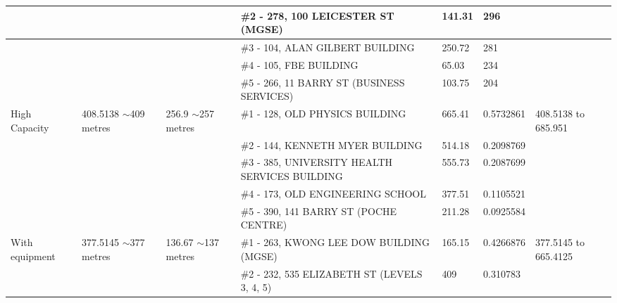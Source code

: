 \begin{table}[H]
{\begin{tabular}{|l|l|l|l|l|l|l|}
                        &                           &                          & \#2 - 278, 100 LEICESTER ST (MGSE)                      & 141.31        & 296             &                           \\ \hline
                        &                           &                          & \#3 - 104, ALAN GILBERT BUILDING                        & 250.72        & 281             &                           \\ \hline
                        &                           &                          & \#4 - 105, FBE BUILDING                                 & 65.03         & 234             &                           \\ \hline
                        &                           &                          & \#5 - 266, 11 BARRY ST (BUSINESS SERVICES)              & 103.75        & 204             &                           \\ \hline
High Capacity           & 408.5138 $\sim$409 metres & 256.9 $\sim$257 metres   & \#1 - 128, OLD PHYSICS BUILDING                         & 665.41        & 0.5732861       & 408.5138 to 685.951       \\ \hline
                        &                           &                          & \#2 - 144, KENNETH MYER BUILDING                        & 514.18        & 0.2098769       &                           \\ \hline
                        &                           &                          & \#3 - 385, UNIVERSITY HEALTH SERVICES BUILDING          & 555.73        & 0.2087699       &                           \\ \hline
                        &                           &                          & \#4 - 173, OLD ENGINEERING SCHOOL                       & 377.51        & 0.1105521       &                           \\ \hline
                        &                           &                          & \#5 - 390, 141 BARRY ST (POCHE CENTRE)                  & 211.28        & 0.0925584       &                           \\ \hline
With equipment         & 377.5145 $\sim$377 metres & 136.67 $\sim$137 metres  & \#1 - 263, KWONG LEE DOW BUILDING (MGSE)                & 165.15        & 0.4266876       & 377.5145 to 665.4125      \\ \hline
                        &                           &                          & \#2 - 232, 535 ELIZABETH ST (LEVELS 3, 4, 5)            & 409           & 0.310783        &                           \\ \hline

\end{tabular}}
\end{table}
